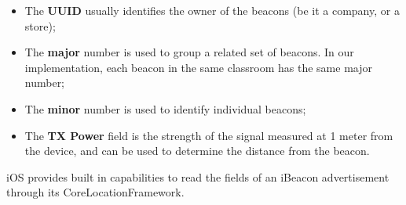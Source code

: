 \begin{itemize}
	\item The \textbf{UUID} usually identifies the owner of the beacons (be it a company, or a store);
	\item The \textbf{major} number is used to group a related set of beacons. In our implementation, each beacon in the same classroom has the same major number;
	\item The \textbf{minor} number is used to identify individual beacons;
	\item The \textbf{TX Power} field is the strength of the signal measured at 1 meter from the device, and can be used to determine the distance from the beacon.
\end{itemize}

iOS provides built in capabilities to read the fields of an iBeacon advertisement through its CoreLocationFramework.